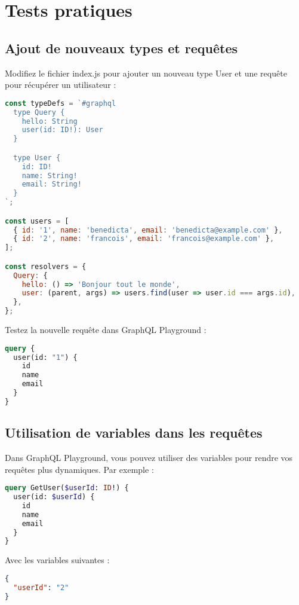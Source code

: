 \documentclass{article}
\begin{document}
\section{Tests pratiques}
\subsection{Ajout de nouveaux types et requêtes}
Modifiez le fichier index.js pour ajouter un nouveau type User et une requête pour récupérer un utilisateur :
\begin{lstlisting}[language=JavaScript]
const typeDefs = `#graphql
  type Query {
    hello: String
    user(id: ID!): User
  }

  type User {
    id: ID!
    name: String!
    email: String!
  }
`;

const users = [
  { id: '1', name: 'benedicta', email: 'benedicta@example.com' },
  { id: '2', name: 'francois', email: 'francois@example.com' },
];

const resolvers = {
  Query: {
    hello: () => 'Bonjour tout le monde',
    user: (parent, args) => users.find(user => user.id === args.id),
  },
};
\end{lstlisting}

Testez la nouvelle requête dans GraphQL Playground :
\begin{lstlisting}[language=GraphQL]
query {
  user(id: "1") {
    id
    name
    email
  }
}
\end{lstlisting}

\subsection{Utilisation de variables dans les requêtes}
Dans GraphQL Playground, vous pouvez utiliser des variables pour rendre vos requêtes plus dynamiques. Par exemple :
\begin{lstlisting}[language=GraphQL]
query GetUser($userId: ID!) {
  user(id: $userId) {
    id
    name
    email
  }
}
\end{lstlisting}

Avec les variables suivantes :
\begin{lstlisting}[language=JSON]
{
  "userId": "2"
}
\end{lstlisting}
\end{document}
